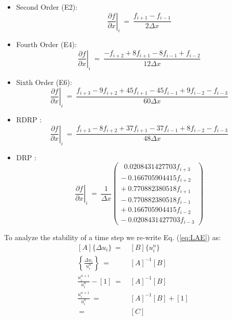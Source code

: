 \documentclass[conf]{new-aiaa}
\begin{document}
\begin{itemize}
	\item Second Order (E2):
		\begin{equation*}
			\left.\frac{\partial{f}}{\partial{x}}\right|_{i}~=~\frac{f_{i+1}-f_{i-1}}{2\Delta{x}}
		\end{equation*}
	\item Fourth Order (E4):
		\begin{equation*}
			\left.\frac{\partial{f}}{\partial{x}}\right|_{i}~=~\frac{-f_{i+2}+8f_{i+1}-8f_{i-1}+f_{i-2}}{12\Delta{x}}
		\end{equation*}	
	\item Sixth Order (E6):
		\begin{equation*}
			\left.\frac{\partial{f}}{\partial{x}}\right|_{i}~=~\frac{f_{i+3}-9f_{i+2}+45f_{i+1}-45f_{i-1}+9f_{i-2}-f_{i-3}}{60\Delta{x}}
		\end{equation*}
	\item RDRP \cite{RDRP}:
		\begin{equation*}
			\left.\frac{\partial{f}}{\partial{x}}\right|_{i}~=~\frac{f_{i+3}-8f_{i+2}+37f_{i+1}-37f_{i-1}+8f_{i-2}-f_{i-3}}{48\Delta{x}}
		\end{equation*}
	\item DRP \cite{DRP}:
		\begin{equation*}
			\left.\frac{\partial{f}}{\partial{x}}\right|_{i}~=~\frac{1}{\Delta{x}}
				\left(\begin{matrix} 	
					~~0.0208431427703f_{i+3} \\
					-~0.166705904415f_{i+2}  \\
					+~0.770882380518f_{i+1}  \\
					-~0.770882380518f_{i-1}  \\
					+~0.166705904415f_{i-2}  \\
					-~0.0208431427703f_{i-3}
				\end{matrix}
				\right)
		\end{equation*}
\end{itemize}
To analyze the stability of a time step we re-write Eq. (\ref{eq:LAE}) as:
\begin{equation}
\label{eq:AB}
	\begin{split}
  		[A]\{\Delta{u_i\}}~=&~[B]\{u_i^{n}\} \\
  		\left\{\frac{\Delta{u_i}}{u_i^{n}}\right\}~=&~[A]^{-1}[B] \\
  		\frac{u_i^{n+1}}{u_i^{n}} - [1]~=&~[A]^{-1}[B] \\
  		\frac{u_i^{n+1}}{u_i^{n}}~=&~[A]^{-1}[B] + [1] \\
  		~=&~[C]
	\end{split}
\end{equation}
\end{document}
